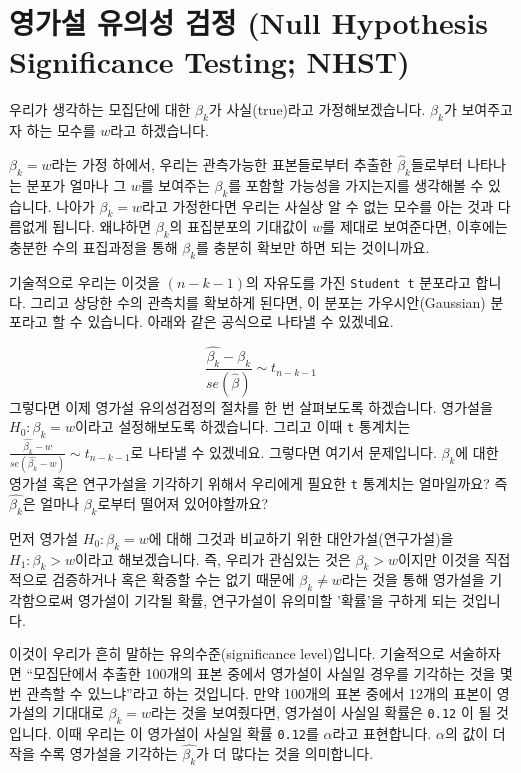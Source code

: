 \documentclass[
]{book}
\begin{document}
\hypertarget{uxc601uxac00uxc124-uxc720uxc758uxc131-uxac80uxc815-null-hypothesis-significance-testing-nhst}{%
\section{영가설 유의성 검정 (Null Hypothesis Significance Testing; NHST)}\label{uxc601uxac00uxc124-uxc720uxc758uxc131-uxac80uxc815-null-hypothesis-significance-testing-nhst}}

우리가 생각하는 모집단에 대한 \(\beta_k\)가 사실(true)라고 가정해보겠습니다. \(\beta_k\)가 보여주고자 하는 모수를 \(w\)라고 하겠습니다.

\(\beta_k = w\)라는 가정 하에서, 우리는 관측가능한 표본들로부터 추출한 \(\hat{\beta}_k\)들로부터 나타나는 분포가 얼마나 그 \(w\)를 보여주는 \(\beta_k\)를 포함할 가능성을 가지는지를 생각해볼 수 있습니다. 나아가 \(\beta_k = w\)라고 가정한다면 우리는 사실상 알 수 없는 모수를 아는 것과 다름없게 됩니다. 왜냐하면 \(\beta_k\)의 표집분포의 기대값이 \(w\)를 제대로 보여준다면, 이후에는 충분한 수의 표집과정을 통해 \(\beta_k\)를 충분히 확보만 하면 되는 것이니까요.

기술적으로 우리는 이것을 \((n-k-1)\)의 자유도를 가진 \texttt{Student\ t} 분포라고 합니다. 그리고 상당한 수의 관측치를 확보하게 된다면, 이 분포는 가우시안(Gaussian) 분포라고 할 수 있습니다. 아래와 같은 공식으로 나타낼 수 있겠네요.

\[
\frac{\hat{\beta_k} - \beta_k}{se(\hat{\beta})} \sim t_{n-k-1}
\]
그렇다면 이제 영가설 유의성검정의 절차를 한 번 살펴보도록 하겠습니다. 영가설을 \(H_0: \beta_k = w\)이라고 설정해보도록 하겠습니다. 그리고 이때 \texttt{t} 통계치는 \(\frac{\hat{\beta_k} - w}{se(\hat{\beta_k}-w)} \sim t_{n-k-1}\)로 나타낼 수 있겠네요. 그렇다면 여기서 문제입니다. \(\beta_k\)에 대한 영가설 혹은 연구가설을 기각하기 위해서 우리에게 필요한 \texttt{t} 통계치는 얼마일까요? 즉 \(\hat{\beta_k}\)은 얼마나 \(\beta_k\)로부터 떨어져 있어야할까요?

먼저 영가설 \(H_0: \beta_k = w\)에 대해 그것과 비교하기 위한 대안가설(연구가설)을 \(H_1: \beta_k > w\)이라고 해보겠습니다. 즉, 우리가 관심있는 것은 \(\beta_k > w\)이지만 이것을 직접적으로 검증하거나 혹은 확증할 수는 없기 때문에 \(\beta_k \neq w\)라는 것을 통해 영가설을 기각함으로써 영가설이 기각될 확률, 연구가설이 유의미할 '확률'을 구하게 되는 것입니다.

이것이 우리가 흔히 말하는 유의수준(significance level)입니다. 기술적으로 서술하자면 ``모집단에서 추출한 100개의 표본 중에서 영가설이 사실일 경우를 기각하는 것을 몇 번 관측할 수 있느냐''라고 하는 것입니다. 만약 100개의 표본 중에서 12개의 표본이 영가설의 기대대로 \(\beta_k = w\)라는 것을 보여줬다면, 영가설이 사실일 확률은 \texttt{0.12} 이 될 것입니다. 이때 우리는 이 영가설이 사실일 확률 \texttt{0.12}를 \(\alpha\)라고 표현합니다. \(\alpha\)의 값이 더 작을 수록 영가설을 기각하는 \(\hat{\beta_k}\)가 더 많다는 것을 의미합니다.
\end{document}
